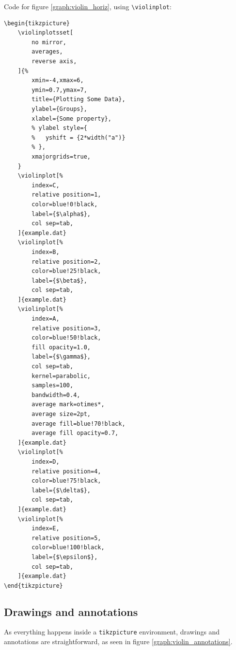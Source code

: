 \documentclass{article}
\begin{document}
Code for figure \ref{graph:violin_horiz}, using
\texttt{{\textbackslash}violinplot}:


\begin{verbatim}
\begin{tikzpicture}
	\violinplotsset[
		no mirror,
		averages,
		reverse axis,
	]{%
		xmin=-4,xmax=6,
		ymin=0.7,ymax=7,
		title={Plotting Some Data},
		ylabel={Groups},
		xlabel={Some property},
		% ylabel style={
		% 	yshift = {2*width("a")}
		% },
		xmajorgrids=true,
	}
	\violinplot[%
		index=C,
		relative position=1,
		color=blue!0!black,
		label={$\alpha$},
		col sep=tab,
	]{example.dat}
	\violinplot[%
		index=B,
		relative position=2,
		color=blue!25!black,
		label={$\beta$},
		col sep=tab,
	]{example.dat}
	\violinplot[%
		index=A,
		relative position=3,
		color=blue!50!black,
		fill opacity=1.0,
		label={$\gamma$},
		col sep=tab,
		kernel=parabolic,
		samples=100,
		bandwidth=0.4,
		average mark=otimes*,
		average size=2pt,
		average fill=blue!70!black,
		average fill opacity=0.7,
	]{example.dat}
	\violinplot[%
		index=D,
		relative position=4,
		color=blue!75!black,
		label={$\delta$},
		col sep=tab,
	]{example.dat}
	\violinplot[%
		index=E,
		relative position=5,
		color=blue!100!black,
		label={$\epsilon$},
		col sep=tab,
	]{example.dat}
\end{tikzpicture}
\end{verbatim}

\subsection{Drawings and annotations}

As everything happens inside a \texttt{tikzpicture} environment, drawings
and annotations are straightforward, as seen in figure \ref{graph:violin_annotations}.
\end{document}

